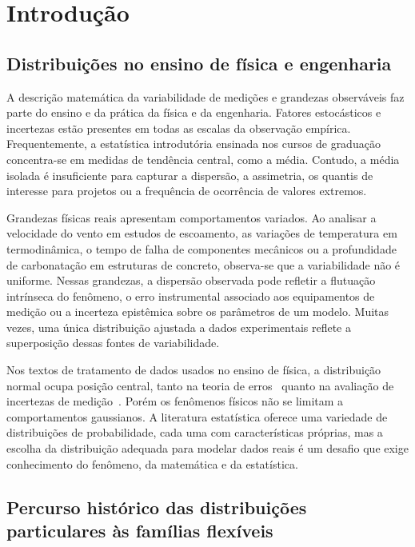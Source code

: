 \section{Introdução}\label{sec:introducao}

\subsection{Distribuições no ensino de física e engenharia}

A descrição matemática da variabilidade de medições e grandezas observáveis faz parte do ensino e da prática da física e da engenharia. Fatores estocásticos e incertezas estão presentes em todas as escalas da observação empírica. Frequentemente, a estatística introdutória ensinada nos cursos de graduação concentra-se em medidas de tendência central, como a média. Contudo, a média isolada é insuficiente para capturar a dispersão, a assimetria, os quantis de interesse para projetos ou a frequência de ocorrência de valores extremos.

Grandezas físicas reais apresentam comportamentos variados. Ao analisar a velocidade do vento em estudos de escoamento, as variações de temperatura em termodinâmica, o tempo de falha de componentes mecânicos ou a profundidade de carbonatação em estruturas de concreto, observa-se que a variabilidade não é uniforme. Nessas grandezas, a dispersão observada pode refletir a flutuação intrínseca do fenômeno, o erro instrumental associado aos equipamentos de medição ou a incerteza epistêmica sobre os parâmetros de um modelo. Muitas vezes, uma única distribuição ajustada a dados experimentais reflete a superposição dessas fontes de variabilidade.

Nos textos de tratamento de dados usados no ensino de física, a distribuição normal ocupa posição central, tanto na teoria de erros~\cite{taylor1997} quanto na avaliação de incertezas de medição~\cite{gum2008}. Porém os fenômenos físicos não se limitam a comportamentos gaussianos. A literatura estatística oferece uma variedade de distribuições de probabilidade, cada uma com características próprias, mas a escolha da distribuição adequada para modelar dados reais é um desafio que exige conhecimento do fenômeno, da matemática e da estatística.

\subsection{Percurso histórico das distribuições particulares às famílias flexíveis}

